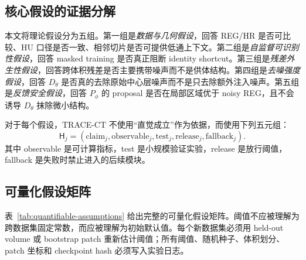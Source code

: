 \documentclass[11pt,a4paper,UTF8,fontset=fandol]{ctexart}
\theoremstyle{definition}
\begin{document}
\subsection{核心假设的证据分解}

本文将理论假设分为五组。第一组是\emph{数据与几何假设}，回答 REG/HR 是否可比较、HU 口径是否一致、相邻切片是否可提供低通上下文。第二组是\emph{自监督可识别性假设}，回答 masked training 是否真正阻断 identity shortcut。第三组是\emph{残差外生性假设}，回答跨体积残差是否主要携带噪声而不是供体结构。第四组是\emph{去噪强度假设}，回答 $D_\theta$ 是否真的去除原始中心层噪声而不是只去除额外注入噪声。第五组是\emph{反馈安全假设}，回答 $P_\phi$ 的 proposal 是否在局部区域优于 noisy REG，且不会诱导 $D_\theta$ 抹除微小结构。

对于每个假设，TRACE-CT 不使用“直觉成立”作为依据，而使用下列五元组：
\begin{equation}
\mathsf H_j=\left(\text{claim}_j,\text{observable}_j,\text{test}_j,\text{release}_j,\text{fallback}_j\right).
\end{equation}
其中 observable 是可计算指标，test 是小规模验证实验，release 是放行阈值，fallback 是失败时禁止进入的后续模块。

\subsection{可量化假设矩阵}
\label{subsec:quantified-assumption-matrix}

表~\ref{tab:quantifiable-assumptions} 给出完整的可量化假设矩阵。阈值不应被理解为跨数据集固定常数，而应被理解为初始默认值。每个新数据集必须用 held-out volume 或 bootstrap patch 重新估计阈值；所有阈值、随机种子、体积划分、patch 坐标和 checkpoint hash 必须写入实验日志。
\end{document}
